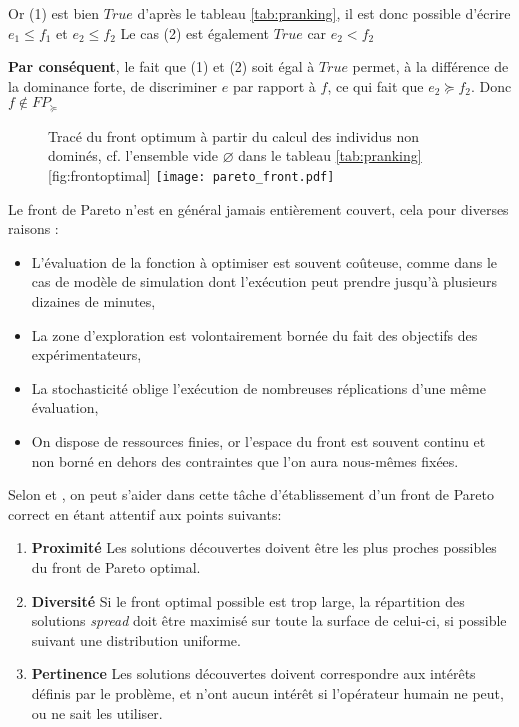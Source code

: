Or (1) est bien $True$ d'après le tableau \ref{tab:pranking}, il est donc possible d'écrire $e_1 \leq f_1$ et $e_2 \leq f_2$ Le cas (2) est également $True$ car $e_2 < f_2$

\textbf{Par conséquent}, le fait que (1) et (2) soit égal à $True$ permet, à la différence de la dominance forte, de discriminer $e$ par rapport à $f$, ce qui fait  que $e_2 \succeq f_2$. Donc $f \notin FP_{\succeq}$

\begin{figure}[!htb]
	\begin{sidecaption}[fortoc]{Tracé du front optimum à partir du calcul des individus non dominés, cf. l'ensemble vide $\varnothing$ dans le tableau \ref{tab:pranking}}[fig:frontoptimal]
		\centering
		\texttt{[image: pareto\_front.pdf]}{
		}
  \end{sidecaption}
\end{figure}

Le front de Pareto n'est en général jamais entièrement couvert, cela pour diverses raisons :

\begin{itemize}
\item L'évaluation de la fonction à optimiser est souvent coûteuse, comme dans le cas de modèle de simulation dont l'exécution peut prendre jusqu'à plusieurs dizaines de minutes,
\item La zone d'exploration est volontairement bornée du fait des objectifs des expérimentateurs,
\item La stochasticité oblige l'exécution de nombreuses réplications d'une même évaluation,
\item On dispose de ressources finies, or l'espace du front est souvent continu et non borné en dehors des contraintes que l'on aura nous-mêmes fixées.
\end{itemize}

Selon \textcite[70]{Weise2011} et \autocite[19]{Zitzler1999a}, on peut s'aider dans cette tâche d'établissement d'un front de Pareto correct en étant attentif aux points suivants:

\begin{enumerate}
\item{\textbf{Proximité}} Les solutions découvertes doivent être les plus proches possibles du front de Pareto optimal.
\item{\textbf{Diversité}} Si le front optimal possible est trop large, la répartition des solutions \textit{spread} doit être maximisé sur toute la surface de celui-ci, si possible suivant une distribution uniforme.
\item{\textbf{Pertinence}} Les solutions découvertes doivent correspondre aux intérêts définis par le problème, et n'ont aucun intérêt si l'opérateur humain ne peut, ou ne sait les utiliser.
\end{enumerate}

